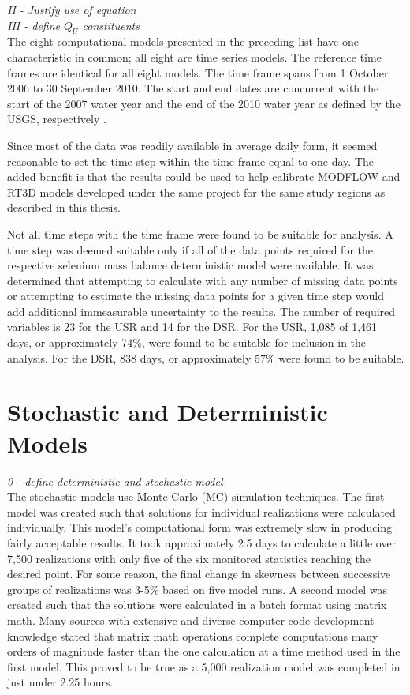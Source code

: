 \begin{linenumbers}
\emph{II - Justify use of equation}\\

\emph{III - define $Q_U$ constituents}\\

The eight computational models presented in the preceding list have one characteristic in common; all eight are time series models.  The reference time frames are identical for all eight models.  The time frame spans from 1 October 2006 to 30 September 2010.  The start and end dates are concurrent with the start of the 2007 water year and the end of the 2010 water year as defined by the USGS, respectively \citep{USGS2014}.

Since most of the data was readily available in average daily form, it seemed reasonable to set the time step within the time frame equal to one day.  The added benefit is that the results could be used to help calibrate MODFLOW and RT3D models developed under the same project for the same study regions as described in this thesis.

Not all time steps with the time frame were found to be suitable for analysis.  A time step was deemed suitable only if all of the data points required for the respective selenium mass balance deterministic model were available.  It was determined that attempting to calculate with any number of missing data points or attempting to estimate the missing data points for a given time step would add additional immeasurable uncertainty to the results.  The number of required variables is 23 for the USR and 14 for the DSR.  For the USR, 1,085 of 1,461 days, or approximately 74\%, were found to be suitable for inclusion in the analysis.  For the DSR, 838 days, or approximately 57\% were found to be suitable.



\clearpage{}
\section{Stochastic and Deterministic Models}
\label{sec:StochAndDetermModels}

\emph{0 - define deterministic and stochastic model}\\
The stochastic models use Monte Carlo (MC) simulation techniques.  The first model was created such that solutions for individual realizations were calculated individually.  This model's computational form was extremely slow in producing fairly acceptable results.  It took approximately 2.5 days to calculate a little over 7,500 realizations with only five of the six monitored statistics reaching the desired point.  For some reason, the final change in skewness between successive groups of realizations was 3-5\% based on five model runs.  A second model was created such that the solutions were calculated in a batch format using matrix math.  Many sources with extensive and diverse computer code development knowledge stated that matrix math operations complete computations many orders of magnitude faster than the one calculation at a time method used in the first model.  This proved to be true as a 5,000 realization model was completed in just under 2.25 hours.


\end{linenumbers}
